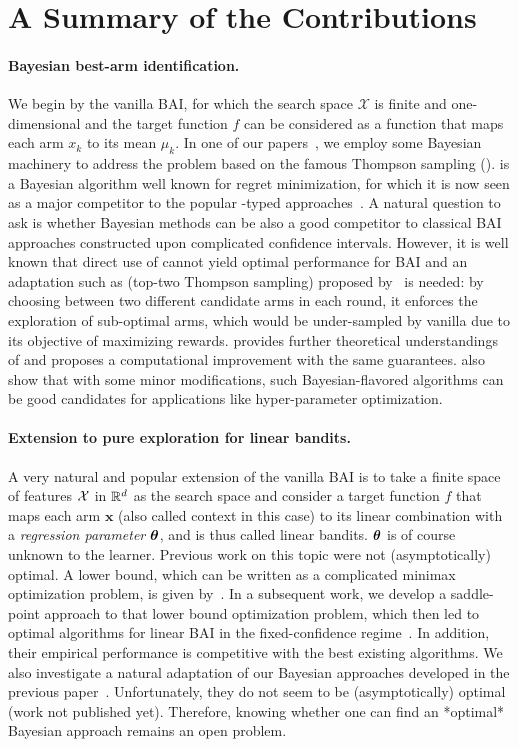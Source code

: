     
\section{A Summary of the Contributions}\label{sec:intro.contributions}

\paragraph{Bayesian best-arm identification.} We begin by the vanilla BAI, for which the search space $\mathcal{X}$ is finite and one-dimensional and the target function $f$ can be considered as a function that maps each arm $x_k$ to its mean $\mu_k$. In one of our papers~\citep{shang2020t3c}, we employ some Bayesian machinery to address the problem based on the famous Thompson sampling (\TS). \TS is a Bayesian algorithm well known for regret minimization, for which it is now seen as a major competitor to the popular \UCB-typed approaches~\citep{auer2002ucb}. A natural question to ask is whether Bayesian methods can be also a good competitor to classical BAI approaches constructed upon complicated confidence intervals. However, it is well known that direct use of \TS cannot yield optimal performance for BAI and an adaptation such as \TTTS (top-two Thompson sampling) proposed by~\cite{russo2016ttts} is needed: by choosing between two different candidate arms in each round, it enforces the exploration of sub-optimal arms, which would be under-sampled by vanilla \TS due to its objective of maximizing rewards. \cite{shang2020t3c} provides further theoretical understandings of \TTTS and proposes a computational improvement \TCC with the same guarantees. \cite{shang2019dttts} also show that with some minor modifications, such Bayesian-flavored algorithms can be good candidates for applications like hyper-parameter optimization.

\paragraph{Extension to pure exploration for linear bandits.} A very natural and popular extension of the vanilla BAI is to take a finite space of features $\mathcal{X}$ in $\mathbb{R}^d$ as the search space and consider a target function $f$ that maps each arm $\mathbf{x}$ (also called context in this case) to its linear combination with a \emph{regression parameter} ${\boldsymbol \theta}$, and is thus called linear bandits. ${\boldsymbol \theta}$ is of course unknown to the learner. Previous work on this topic were not (asymptotically) optimal. A lower bound, which can be written as a complicated minimax optimization problem, is given by~\cite{garivier2016tracknstop}. In a subsequent work, we develop a saddle-point approach to that lower bound optimization problem, which then led to optimal algorithms for linear BAI in the fixed-confidence regime~\citep{degenne2020game}. In addition, their empirical performance is competitive with the best existing algorithms. We also investigate a natural adaptation of our Bayesian approaches developed in the previous paper~\citep{shang2020t3c}. Unfortunately, they do not seem to be (asymptotically) optimal (work not published yet). Therefore, knowing whether one can find an *optimal* Bayesian approach remains an open problem.

